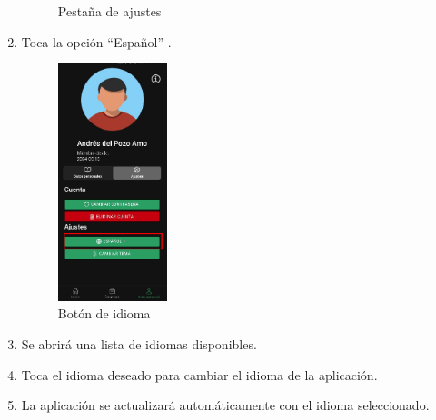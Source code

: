 \begin{enumerate}
\begin{figure}[H]
		      \caption{Pestaña de ajustes}
	      \end{figure}
	\item Toca la opción “Español” .
	      \begin{figure}[H]
		      \centering
		      \includegraphics[width=0.3\textwidth]{7-Construccion/Manuales/app/P5-Idioma.png}
		      \caption{Botón de idioma}
	      \end{figure}
	\item Se abrirá una lista de idiomas disponibles.
	\item Toca el idioma deseado para cambiar el idioma de la aplicación.
	\item La aplicación se actualizará automáticamente con el idioma seleccionado.
\end{enumerate}


